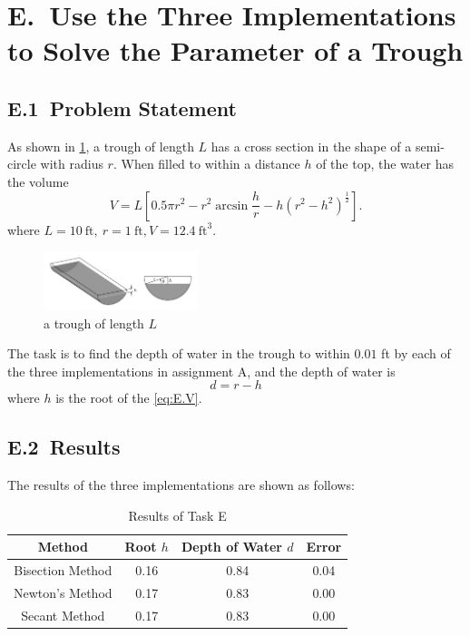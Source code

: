 \documentclass[a4paper]{article}
\begin{document}
\section*{E.\ Use the Three Implementations to Solve the Parameter of a Trough}

\subsection*{E.1\ Problem Statement}

As shown in \cref{fig:E}, a trough of length $L$ has a cross section in the shape of a semi-circle with radius $r$. 
When filled to within a distance $h$ of the top, the water has the volume 
\begin{equation}
  V = L\left[ 0.5\pi r^2 - r^2 \arcsin \frac{h}{r} - h(r^2 - h^2)^{\frac{1}{2}} \right].
  \label{eq:E.V} 
\end{equation}
where $L = 10\ \text{ft},\ r = 1\ \text{ft}, V = 12.4\ \text{ft}^3$.

\begin{figure}[htbp]
  \centering
  \includegraphics[width = 0.4\textwidth]{../images/E.png}
  \caption{a trough of length $L$}
  \label{fig:E}
\end{figure}

The task is to find the depth of water in the trough to within $0.01$ ft by each of the three implementations in assignment A, and the depth of water is
\begin{equation}
  d = r - h
  \label{eq:E.d}
\end{equation}
where $h$ is the root of the \cref{eq:E.V}.

\subsection*{E.2\ Results}

The results of the three implementations are shown as follows:
\begin{table}[htbp]
  \centering
  \begin{tabular}{|c|c|c|c|}
    \hline
    \textbf{Method} & \textbf{Root} $h$ & \textbf{Depth of Water} $d$ & \textbf{Error} \\
    \hline
    Bisection Method & 0.16 & 0.84 & 0.04 \\
    \hline 
    Newton's Method & 0.17 & 0.83 & 0.00 \\
    \hline 
    Secant Method & 0.17 & 0.83 & 0.00 \\
    \hline
  \end{tabular}
  \caption{Results of Task E}
\end{table}
\end{document}
